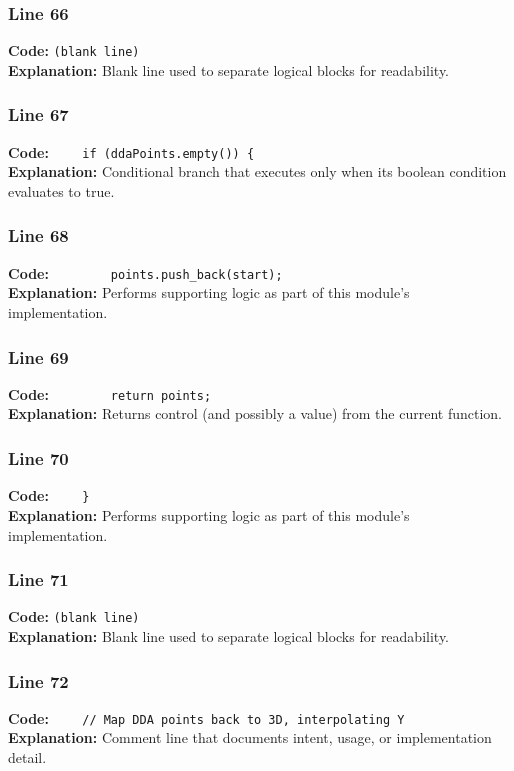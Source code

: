 \documentclass[11pt,a4paper]{article}
\begin{document}
\subsubsection*{Line 66}
\textbf{Code:} \texttt{(blank line)}\\
\textbf{Explanation:} Blank line used to separate logical blocks for readability.

\subsubsection*{Line 67}
\textbf{Code:} \verb|    if (ddaPoints.empty()) {|\\
\textbf{Explanation:} Conditional branch that executes only when its boolean condition evaluates to true.

\subsubsection*{Line 68}
\textbf{Code:} \verb|        points.push_back(start);|\\
\textbf{Explanation:} Performs supporting logic as part of this module's implementation.

\subsubsection*{Line 69}
\textbf{Code:} \verb|        return points;|\\
\textbf{Explanation:} Returns control (and possibly a value) from the current function.

\subsubsection*{Line 70}
\textbf{Code:} \verb|    }|\\
\textbf{Explanation:} Performs supporting logic as part of this module's implementation.

\subsubsection*{Line 71}
\textbf{Code:} \texttt{(blank line)}\\
\textbf{Explanation:} Blank line used to separate logical blocks for readability.

\subsubsection*{Line 72}
\textbf{Code:} \verb|    // Map DDA points back to 3D, interpolating Y|\\
\textbf{Explanation:} Comment line that documents intent, usage, or implementation detail.
\end{document}
